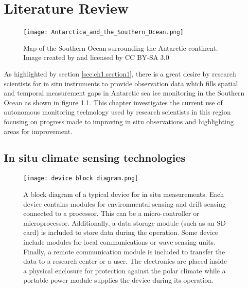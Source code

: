 
\chapter{Literature Review}
\label{ch:chapter2}

\begin{figure}[H]
	\centering
	\texttt{[image: Antarctica\_and\_the\_Southern\_Ocean.png]}
	\caption{Map of the Southern Ocean surrounding the Antarctic continent. Image created by \textcite{Hogweed2015Ocean} and licensed by CC BY-SA 3.0}
	\label{fig:Antarctica_Southern_Ocean}
\end{figure}

As highlighted by section \ref{sec:ch1.section1}, there is a great desire by research scientists for in situ instruments to provide observation data which fills spatial and temporal measurement gaps in Antarctic sea ice monitoring in the Southern Ocean as shown in figure \ref{fig:Antarctica_Southern_Ocean}. This chapter investigates the current use of autonomous monitoring technology used by research scientists in this region focusing on progress made to improving in situ observations and highlighting areas for improvement.

\newpage
\section{In situ climate sensing technologies}


\begin{figure}[H]
	\centering
	\texttt{[image: device block diagram.png]}
	\caption{A block diagram of a typical device for in situ measurements. Each device contains modules for environmental sensing and drift sensing connected to a processor. This can be a micro-controller or microprocessor. Additionally, a data storage module (such as an SD card) is included to store data during the operation. Some device include modules for local communications or wave sensing units. Finally, a remote communication module is included to transfer the data to a research center or a user. The electronics are placed inside a physical enclosure for protection against the polar climate while a portable power module supplies the device during its operation.}
	\label{fig:devblockdiag}
\end{figure}

